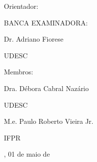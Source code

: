 

%
% 
%

\begin{folhadeaprovacao}

	\begin{center}
		{\selectfont\MakeTextUppercase{\normalsize\imprimirautor}}
	\end{center}
    \vfill
    
	\vfill
	\begin{center}
		{\selectfont\MakeTextUppercase{\imprimirtitulo}}
	\end{center}
	\vfill

    
%


\vfill

{Orientador:} 
        
	 \begin{center}
	 	
    	{\selectfont BANCA EXAMINADORA: }
    	\vspace*{1.75cm}

    
    
		Dr. Adriano Fiorese \par
		UDESC
	 \end{center}
	
    {Membros:} 
    
	\begin{center}
		\vspace*{1.25cm}
		Dra. Débora Cabral Nazário \par
		UDESC
		
		\vspace*{1.25cm}
		M.e. Paulo Roberto Vieira Jr. \par
		IFPR
	
	\end{center}
    
    \vspace*{\fill}  
    \begin{center}
    {\imprimirlocal, 01 de maio de \imprimirdata}
	\end{center}
    \vspace*{0.25cm}  
\end{folhadeaprovacao}
